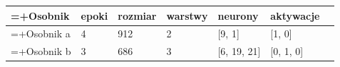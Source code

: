 \begin{tabularx}{0.9\textwidth}{%
  >{\hsize=\dimexpr2\hsize+\tabcolsep}XXXXXXX%
}
  \hline
  Osobnik & epoki & rozmiar
    & warstwy & neurony & aktywacje\\\hline
  Osobnik a & 4 & 912
    & 2 & [9, 1] & [1, 0]\\
  Osobnik b & 3 & 686
    & 3 & [6, 19, 21] & [0, 1, 0]\\\hline
\end{tabularx}
